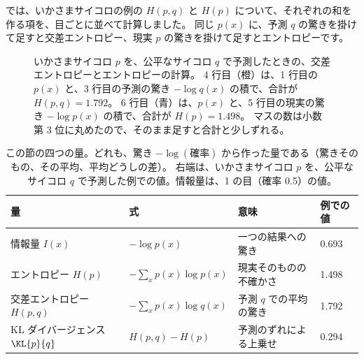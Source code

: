では、いかさまサイコロの例の $H(p,q)$ と $H(p)$ について、それぞれの和を作る項を、目ごとに並べて計算しました。
同じ $p(x)$ に、予測 $q$ の驚きを掛けて足すと交差エントロピー、現実 $p$ の驚きを掛けて足すとエントロピーです。

\begin{figure}[tbp]
\centering
{}
\caption{いかさまサイコロ $p$ を、公平なサイコロ $q$ で予測したときの、交差エントロピーとエントロピーの計算。
4 行目（橙）は、1 行目の $p(x)$ と、3 行目の予測の驚き $-\log q(x)$ の積で、合計が $H(p,q)=1.792$。
6 行目（青）は、$p(x)$ と、5 行目の現実の驚き $-\log p(x)$ の積で、合計が $H(p)=1.498$。
マスの数は小数第 3 位に丸めたので、そのまま足すと合計と少しずれる。}
\label{fig:math-ce-cells}
\end{figure}

\begin{table}[tbp]
\centering
\caption{この節の四つの量。どれも、驚き $-\log(\text{確率})$ から作った量である（驚きそのもの、その平均、平均どうしの差）。
右端は、いかさまサイコロ $p$ を、公平なサイコロ $q$ で予測した例での値。情報量は、1 の目（確率 0.5）の値。}
\label{tab:math-info-summary}
\small
\setlength{\tabcolsep}{4.5pt}
\begin{tabular}{@{}llll@{}}
\toprule
量 & 式 & 意味 & 例での値 \\
\midrule
情報量 $I(x)$ & $-\log p(x)$ & 一つの結果への驚き & 0.693 \\
エントロピー $H(p)$ & $-\sum_x p(x)\log p(x)$ & 現実そのものの不確かさ & 1.498 \\
交差エントロピー $H(p,q)$ & $-\sum_x p(x)\log q(x)$ & 予測 $q$ での平均の驚き & 1.792 \\
KL ダイバージェンス $\KL{p}{q}$ & $H(p,q)-H(p)$ & 予測のずれによる上乗せ & 0.294 \\
\bottomrule
\end{tabular}
\end{table}


